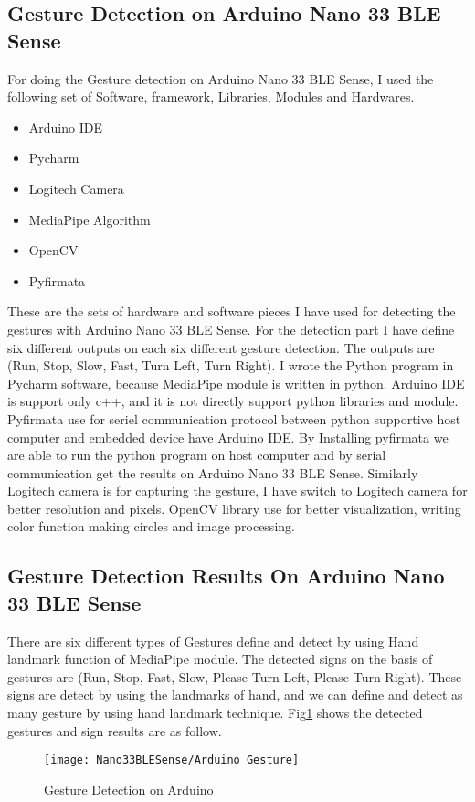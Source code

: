 \subsection{Gesture Detection on Arduino Nano 33 BLE Sense}
For doing the Gesture detection on Arduino Nano 33 BLE Sense, I used the following set of Software, framework, Libraries, Modules and Hardwares.
\begin{itemize}
	\item Arduino IDE
	\item Pycharm
	\item Logitech Camera
	\item MediaPipe Algorithm
	\item OpenCV
	\item Pyfirmata
\end{itemize}  
These are the sets of hardware and software pieces I have used for detecting the gestures with Arduino Nano 33 BLE Sense. For the detection part I have define six different outputs on each six different gesture detection. The outputs are (Run, Stop, Slow, Fast, Turn Left, Turn Right). I wrote the Python program in Pycharm software, because MediaPipe module is written in python. Arduino IDE is support only c++, and it is not directly support python libraries and module. Pyfirmata use for seriel communication protocol between python supportive host computer and embedded device have Arduino IDE. By Installing pyfirmata we are able to run the python program on host computer and by serial communication get the results on Arduino Nano 33 BLE Sense. 
Similarly Logitech camera is for capturing the gesture, I have switch to Logitech camera for better resolution and pixels. OpenCV library use for better visualization, writing color function making circles and image processing.
\subsection{Gesture Detection Results On Arduino Nano 33 BLE Sense}
There are six different types of Gestures define and detect by using Hand landmark function of MediaPipe module. The detected signs on the basis of gestures are (Run, Stop, Fast, Slow, Please Turn Left, Please Turn Right). These signs are detect by using the landmarks of hand, and we can define and detect as many gesture by using hand landmark technique. Fig\ref{Gesture Detection on Arduino} shows the detected gestures and sign results are as follow.
\begin{figure}[h]
	\centering
	\texttt{[image: Nano33BLESense/Arduino Gesture]}
	\caption{Gesture Detection on Arduino}
	\label{Gesture Detection on Arduino}
\end{figure}
